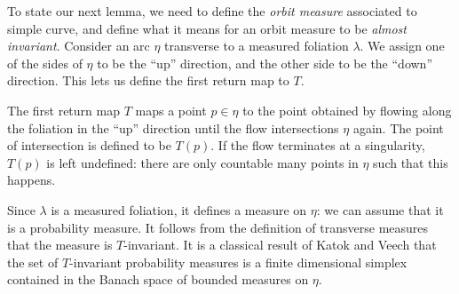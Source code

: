\documentclass[12pt, reqno]{amsart}
\begin{document}
To state our next lemma, we need to define the \emph{orbit measure} associated to simple curve, and define what it means for an orbit measure to be \emph{almost invariant}.
Consider an arc $\eta$ transverse to a measured foliation $\lambda$.
We assign one of the sides of $\eta$ to be the ``up'' direction, and the other side to be the ``down'' direction.
This lets us define the first return map to $T$.
\begin{definition}
  The first return map $T$ maps a point $p \in \eta$ to the point obtained by flowing along the foliation in the ``up'' direction until the flow intersections $\eta$ again.
  The point of intersection is defined to be $T(p)$.
  If the flow terminates at a singularity, $T(p)$ is left undefined: there are only countable many points in $\eta$ such that this happens.
\end{definition}
Since $\lambda$ is a measured foliation, it defines a measure on $\eta$: we can assume that it is a probability measure.
It follows from the definition of transverse measures that the measure is $T$-invariant.
It is a classical result of Katok \cite{zbMATH03467479}  and Veech \cite{Veech1978} that the set of $T$-invariant probability measures is a finite dimensional simplex contained in the Banach space of bounded measures on $\eta$.

\end{document}
